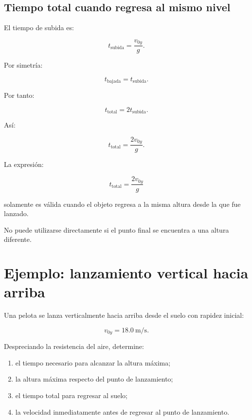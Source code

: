 \subsection{Tiempo total cuando regresa al mismo nivel}

El tiempo de subida es:

\[ t_{\text{subida}}=\frac{v_{0y}}{g}. \]

Por simetría:

\[ t_{\text{bajada}}=t_{\text{subida}}. \]

Por tanto:

\[ t_{\text{total}}=2t_{\text{subida}}. \]

Así:

\[ \boxed{t_{\text{total}}=\frac{2v_{0y}}{g}}. \]

\begin{advertencia}
La expresión:

\[ t_{\text{total}}=\frac{2v_{0y}}{g} \]

solamente es válida cuando el objeto regresa a la misma altura desde la que fue lanzado.

No puede utilizarse directamente si el punto final se encuentra a una altura diferente.
\end{advertencia}


\section{Ejemplo: lanzamiento vertical hacia arriba}

\begin{ejemplo}
Una pelota se lanza verticalmente hacia arriba desde el suelo con rapidez inicial:

\[ v_{0y}=\SI{18.0}{\meter\per\second}. \]

Despreciando la resistencia del aire, determine:

\begin{enumerate}[label=\alph*)]
    \item el tiempo necesario para alcanzar la altura máxima;
    \item la altura máxima respecto del punto de lanzamiento;
    \item el tiempo total para regresar al suelo;
    \item la velocidad inmediatamente antes de regresar al punto de lanzamiento.
\end{enumerate}
\end{ejemplo}


